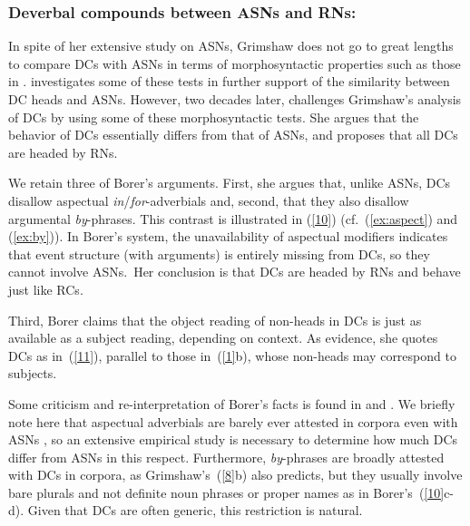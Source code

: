 \documentclass[output=paper]{langsci/langscibook}
\begin{document}
\subsubsection{Deverbal compounds between ASNs and RNs: \cite{borer:13}}
In spite of her extensive study on ASNs, Grimshaw does not go to great lengths to compare DCs with ASNs in terms of  morphosyntactic properties such as those in . \cite{disciullo:92} investigates some of these tests in further support of the similarity between DC heads and ASNs. However, two decades later, \cite{borer:13} challenges Grimshaw's analysis of DCs by using some of these morphosyntactic tests. She argues that the behavior of DCs essentially differs from that of ASNs, and proposes that all DCs are headed by RNs.

We retain three of Borer's arguments.
First, she argues that, unlike ASNs, DCs disallow aspectual \textit{in}/\textit{for}-adverbials and, second, that they also disallow argumental \textit{by}-phrases.
This contrast is illustrated in (\ref{10})  {(cf.\ (\ref{ex:aspect}) and (\ref{ex:by}))}.
In Borer's system, the unavailability of aspectual modifiers indicates that event structure (with arguments) is entirely missing from DCs, so they cannot involve ASNs.\ Her conclusion is that DCs are headed by RNs and behave just like RCs. 

\begin{exe}
\end{exe}

Third, Borer claims that the object reading of non-heads in DCs is just as available as a subject reading, depending on context.
As evidence, she quotes DCs  as in~(\ref{11}), parallel to those in~(\ref{1}b), whose non-heads may correspond to subjects. 

\begin{exe}
\end{exe}

Some criticism and re-interpretation of Borer's facts is found in \cite{iordachioaia:alexiadou:pairamidis:17} and \cite{iordachioaia:toappear}.
We briefly note here that aspectual adverbials are barely ever attested in corpora even with ASNs \citep[39--42]{lieber:16}, so an extensive empirical study is necessary to determine how much DCs differ from ASNs in this respect.
Furthermore, \textit{by}-phrases are broadly attested with DCs in corpora, as Grimshaw's~(\ref{8}b) also predicts, but they usually involve bare plurals and not definite noun phrases or proper names as in Borer's~(\ref{10}c-d).
Given that DCs are often generic, this restriction is natural.
\end{document}
